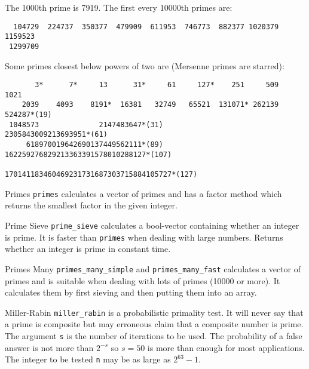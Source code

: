 The 1000th prime is 7919. The first every 10000th primes are:
{\small
\begin{verbatim}
  104729  224737  350377  479909  611953  746773  882377 1020379 1159523
 1299709
\end{verbatim}
}

Some primes closest below powers of two are (Mersenne primes are starred):
{\small
\begin{verbatim}
       3*      7*     13      31*     61     127*    251     509    1021
    2039    4093    8191*  16381   32749   65521  131071* 262139  524287*(19)
 1048573              2147483647*(31)                2305843009213693951*(61)
     618970019642690137449562111*(89)  162259276829213363391578010288127*(107)
                                 170141183460469231731687303715884105727*(127)
\end{verbatim}
}


\begin{algorithm}{Primes}
\desc
{\tt primes} calculates a vector of primes and has a factor method which
returns the smallest factor in the given integer.
\end{algorithm}

\begin{algorithm}{Prime Sieve}
\desc
{\tt prime\_sieve} calculates a bool-vector containing whether an integer
is prime. It is faster than {\tt primes} when dealing with large numbers.
Returns whether an integer is prime in constant time.
\end{algorithm}

\begin{algorithm}{Primes Many}
\desc
{\tt primes\_many\_simple} and {\tt primes\_many\_fast}
calculates a vector of primes and is suitable when dealing with lots of
primes (10000 or more). It calculates them by first sieving and then
putting them into an array.
\end{algorithm}

\begin{algorithm}{Miller-Rabin}
\desc
{\tt miller\_rabin} is a probabilistic primality
test. It will never say that a prime is composite but may erroneous claim
that a composite number is prime. The argument {\tt s} is the number of
iterations to be used. The probability of a false answer is not more than
$2^{-s}$ so $s=50$ is more than enough for most applications. The integer
to be tested {\tt n} may be as large as $2^{63}-1$.
\end{algorithm}

